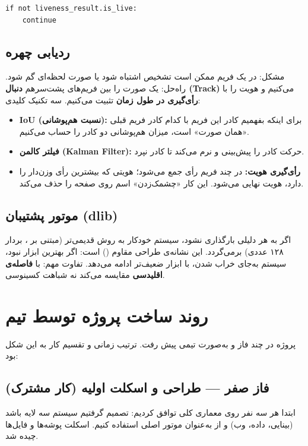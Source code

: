 \documentclass[12pt,a4paper]{article}
\begin{document}
\begin{latin}
\begin{lstlisting}
if not liveness_result.is_live:
    continue
\end{lstlisting}
\end{latin}

\subsection{ردیابی چهره}
مشکل: در یک فریم ممکن است تشخیص اشتباه شود یا صورت لحظه‌ای گم شود. راه‌حل: یک صورت را بین فریم‌های پشت‌سرهم \textbf{دنبال (Track)} می‌کنیم و هویت را با \textbf{رأی‌گیری در طول زمان} تثبیت می‌کنیم. سه تکنیک کلیدی:
\begin{itemize}[rightmargin=0pt]
  \item \textbf{IoU (نسبت هم‌پوشانی):} برای اینکه بفهمیم کادر این فریم با کدام کادر فریم قبلی «همان صورت» است، میزان هم‌پوشانی دو کادر را حساب می‌کنیم.
  \item \textbf{فیلتر کالمن (Kalman Filter):} حرکت کادر را پیش‌بینی و نرم می‌کند تا کادر نپرد.
  \item \textbf{رأی‌گیری هویت:} در چند فریم رأی جمع می‌شود؛ هویتی که بیشترین رأی وزن‌دار را دارد، هویت نهایی می‌شود. این کار «چشمک‌زدن» اسم روی صفحه را حذف می‌کند.
\end{itemize}

\subsection{موتور پشتیبان (dlib)}
اگر  به هر دلیلی بارگذاری نشود، سیستم خودکار به روش قدیمی‌تر  (مبتنی بر ، بردار ۱۲۸ عددی) برمی‌گردد. این نشانه‌ی طراحی مقاوم () است: اگر بهترین ابزار نبود، سیستم به‌جای خراب شدن، با ابزار ضعیف‌تر ادامه می‌دهد. تفاوت مهم:  با \textbf{فاصله‌ی اقلیدسی} مقایسه می‌کند نه شباهت کسینوسی.

\section{روند ساخت پروژه توسط تیم}
پروژه در چند فاز و به‌صورت تیمی پیش رفت. ترتیب زمانی و تقسیم کار به این شکل بود:

\subsection{فاز صفر — طراحی و اسکلت اولیه (کار مشترک)}
ابتدا هر سه نفر روی معماری کلی توافق کردیم: تصمیم گرفتیم سیستم سه لایه باشد (بینایی، داده، وب) و از  به‌عنوان موتور اصلی استفاده کنیم. اسکلت پوشه‌ها و فایل‌ها چیده شد.
\end{document}
